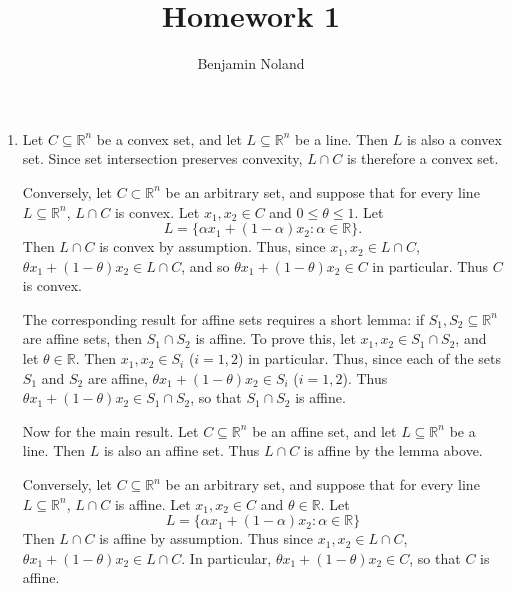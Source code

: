 \documentclass[letterpaper,12pt]{article}
\title{Homework 1}
\author{Benjamin Noland}
\date{}
\begin{document}


\maketitle

\begin{enumerate}
\item Let $C \subseteq \mathbb{R}^n$ be a convex set, and let
  $L \subseteq \mathbb{R}^n$ be a line. Then $L$ is also a convex
  set. Since set intersection preserves convexity, $L \cap C$ is
  therefore a convex set.

  Conversely, let $C \subset \mathbb{R}^n$ be an arbitrary set, and
  suppose that for every line $L \subseteq \mathbb{R}^n$, $L \cap C$
  is convex. Let $x_1, x_2 \in C$ and $0 \leq \theta \leq 1$. Let
  \begin{equation*}
    L = \{\alpha x_1 + (1 - \alpha) x_2 : \alpha \in \mathbb{R}\}.
  \end{equation*}
  Then $L \cap C$ is convex by assumption. Thus, since
  $x_1, x_2 \in L \cap C$,
  $\theta x_1 + (1 - \theta) x_2 \in L \cap C$, and so
  $\theta x_1 + (1 - \theta) x_2 \in C$ in particular. Thus $C$ is
  convex.

  \bigskip

  The corresponding result for affine sets requires a short lemma: if
  $S_1, S_2 \subseteq \mathbb{R}^n$ are affine sets, then
  $S_1 \cap S_2$ is affine. To prove this, let
  $x_1, x_2 \in S_1 \cap S_2$, and let $\theta \in \mathbb{R}$. Then
  $x_1, x_2 \in S_i$ ($i = 1, 2$) in particular. Thus, since each of
  the sets $S_1$ and $S_2$ are affine,
  $\theta x_1 + (1 - \theta) x_2 \in S_i$ ($i = 1, 2$). Thus
  $\theta x_1 + (1 - \theta) x_2 \in S_1 \cap S_2$, so that
  $S_1 \cap S_2$ is affine.

  Now for the main result. Let $C \subseteq \mathbb{R}^n$ be an affine
  set, and let $L \subseteq \mathbb{R}^n$ be a line. Then $L$ is also
  an affine set. Thus $L \cap C$ is affine by the lemma above.

  Conversely, let $C \subseteq \mathbb{R}^n$ be an arbitrary set, and
  suppose that for every line $L \subseteq \mathbb{R}^n$, $L \cap C$
  is affine. Let $x_1, x_2 \in C$ and $\theta \in \mathbb{R}$. Let
  \begin{equation*}
    L = \{\alpha x_1 + (1 - \alpha) x_2 : \alpha \in \mathbb{R}\}
  \end{equation*}
  Then $L \cap C$ is affine by assumption. Thus since
  $x_1, x_2 \in L \cap C$,
  $\theta x_1 + (1 - \theta) x_2 \in L \cap C$. In particular,
  $\theta x_1 + (1 - \theta) x_2 \in C$, so that $C$ is affine.


\end{enumerate}
\end{document}
